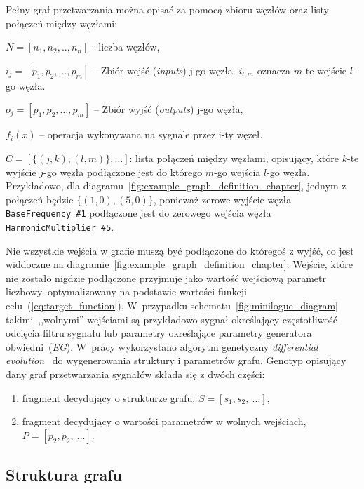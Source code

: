 Pełny graf przetwarzania można opisać za pomocą zbioru węzłów oraz
listy połączeń między węzłami:

$N = [n_1, n_2, .., n_n]$ - liczba węzłów,

$i_{j} = [ p_1, p_2, \ldots, p_m ]$ -- Zbiór wejść (\textit{inputs}) j-go węzła. $i_{l, m}$ oznacza $m$-te wejście $l$-go węzła.

$o_{j} = [ p_1, p_2, \ldots, p_m ]$ -- Zbiór wyjść (\textit{outputs}) j-go węzła,

$f_i(x)$ -- operacja wykonywana na sygnale przez i-ty węzeł. %

$C = [ \{ (j, k), (l, m) \}, \ldots ] $: lista połączeń między węzłami, opisujący, które 
$k$-te wyjście $j$-go węzła podłączone jest do którego $m$-go wejścia $l$-go węzła. Przykładowo,
dla diagramu~\ref{fig:example_graph_definition_chapter}, jednym z połączeń będzie $\{(1, 0), (5, 0)\}$,
ponieważ zerowe wyjście węzła \texttt{BaseFrequency~\#1} podłączone jest do zerowego
wejścia węzła \texttt{HarmonicMultiplier~\#5}.

Nie wszystkie wejścia w grafie muszą być podłączone do któregoś z wyjść, 
co jest widdoczne na diagramie~\ref{fig:example_graph_definition_chapter}.
Wejście, które nie zostało nigdzie podłączone przyjmuje jako wartość wejściową parametr 
liczbowy, optymalizowany na podstawie wartości funkcji celu~(\ref{eq:target_function}).
W~przypadku schematu~\ref{fig:minilogue_diagram} takimi~,,wolnymi'' wejściami są przykładowo
sygnał określający częstotliwość odcięcia filtru sygnału lub parametry określające parametry
generatora obwiedni~(\textit{EG}).
W~pracy wykorzystano algorytm genetyczny \textit{differential evolution}~\cite{2020SciPy-NMeth}
do wygenerowania struktury i parametrów grafu.
Genotyp opisujący dany graf przetwarzania sygnałów składa się z dwóch części:
\begin{enumerate}
  \item fragment decydujący o strukturze grafu, $S = [s_1, s_2,~\ldots]$,
  \item fragment decydujący o wartości parametrów w wolnych wejściach, $P = [p_2, p_2,~\ldots]$.
\end{enumerate}

\subsection{Struktura grafu}\label{sec:graph_structure_definition}

